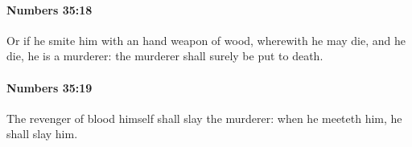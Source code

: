 		\paragraph{Numbers 35:18} %
			\label{NUMBERS-35-18}

			Or if he smite him with an hand weapon of wood, wherewith he may die, and he die, he is a murderer: the murderer shall surely be put to death.


		\paragraph{Numbers 35:19} %
			\label{NUMBERS-35-19}

			The revenger of blood himself shall slay the murderer: when he meeteth him, he shall slay him.


